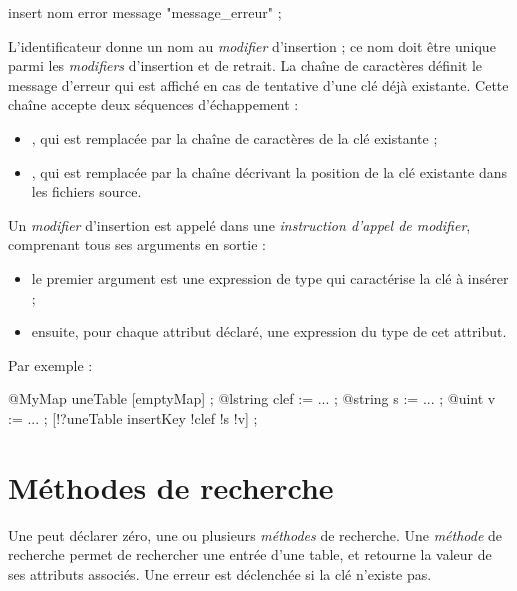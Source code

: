 \begin{galgascode}
insert nom error message "message_erreur" ;
\end{galgascode}

L'identificateur  donne un nom au \emph{modifier} d'insertion ; ce nom doit être unique parmi les \emph{modifiers} d'insertion et de retrait. La chaîne de caractères  définit le message d'erreur qui est affiché en cas de tentative d'une clé déjà existante. Cette chaîne accepte deux séquences d'échappement :
\begin{itemize}
  \item {}, qui est remplacée par la chaîne de caractères de la clé existante ;
  \item {}, qui est remplacée par la chaîne décrivant la position de la clé existante dans les fichiers source.
\end{itemize}


Un \emph{modifier} d'insertion est appelé dans une \emph{instruction d'appel de modifier}, comprenant tous ses arguments en sortie :
\begin{itemize}
  \item le premier argument est une expression de type  qui caractérise la clé à insérer ;
  \item ensuite, pour chaque attribut déclaré, une expression du type de cet attribut.
\end{itemize}

Par exemple :
\begin{galgascode}
@MyMap uneTable [emptyMap] ;
@lstring clef := ... ;
@string s := ... ;
@uint v := ... ;
[!?uneTable insertKey !clef !s !v] ;
\end{galgascode}











\section{Méthodes de recherche}

Une  peut déclarer zéro, une ou plusieurs \emph{méthodes} de recherche. Une \emph{méthode} de recherche permet de rechercher une entrée d'une table, et retourne la valeur de ses attributs associés. Une erreur est déclenchée si la clé n'existe pas.


